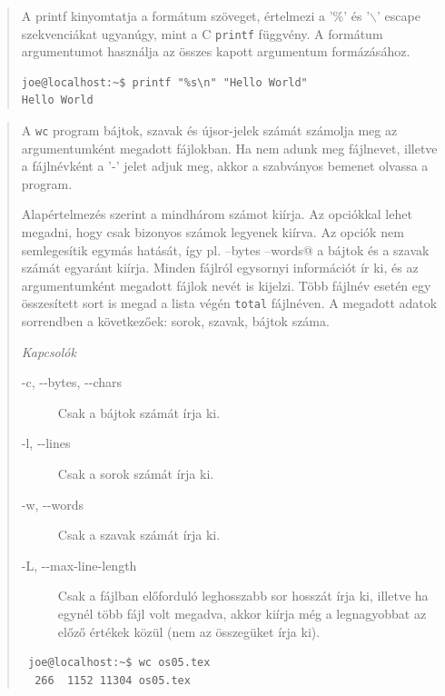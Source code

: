 \clearpage

\noindent{}

   \begin{quotation}
      A printf kinyomtatja a formátum szöveget, értelmezi a '\%' és '$\backslash$' escape
       szekvenciákat ugyanúgy, mint a C \texttt{printf} függvény.  A formátum  argumentumot használja az összes kapott argumentum formázásához.
       
\begin{lstlisting}
joe@localhost:~$ printf "%s\n" "Hello World"  
Hello World
\end{lstlisting}
       \end{quotation}
\bigskip


\noindent{}
	


\begin{quotation}
       A \verb.wc. program bájtok, szavak és újsor-jelek számát számolja meg az argumentumként megadott fájlokban.  Ha nem adunk meg fájlnevet,  illetve  a fájlnévként a '-' jelet adjuk meg, akkor a szabványos bemenet olvassa a program.

       Alapértelmezés szerint a \verb@wc@ mindhárom számot kiírja. Az opciókkal lehet megadni,  hogy csak bizonyos számok legyenek kiírva. Az opciók nem semlegesítik egymás hatását, így pl.  \verb@wc --bytes --words@  a  bájtok  és  a szavak számát egyaránt kiírja.  Minden fájlról egysornyi információt ír ki, és az argumentumként megadott fájlok nevét is kijelzi. Több fájlnév  esetén egy összesített sort is megad a lista végén \texttt{total} fájlnéven. A megadott adatok sorrendben a következőek: sorok, szavak, bájtok száma.
\bigskip

\textit{Kapcsolók}
\begin{description}
\item[-c, -{}-bytes, -{}-chars]
              Csak a bájtok számát írja ki.

\item[-l, -{}-lines]
              Csak a sorok számát írja ki.

\item[-w, -{}-words]
              Csak a szavak számát írja ki.

\item[-L, -{}-max-line-length]
              Csak a fájlban  előforduló  leghosszabb  sor  hosszát  írja  ki,
              illetve  ha  egynél  több  fájl volt megadva, akkor kiírja még a
              legnagyobbat az előző értékek közül (nem az összegüket írja ki).
\end{description}

\begin{lstlisting}
 joe@localhost:~$ wc os05.tex
  266  1152 11304 os05.tex
\end{lstlisting}

\end{quotation}

